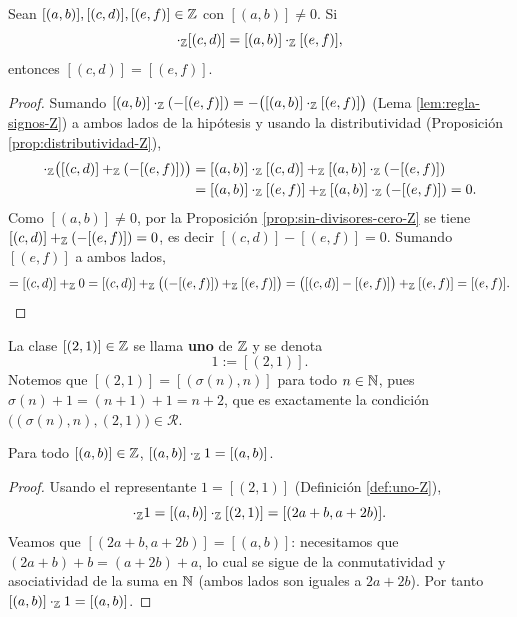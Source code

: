 \documentclass[12pt,a4paper]{book}
\begin{document}
    \begin{proposicion}
        \label{prop:cancelacion-Z}
        Sean $[(a,b)],[(c,d)],[(e,f)]\in\mathbb{Z}$ con $[(a,b)]\neq0$. Si
        \begin{equation*}
            [(a,b)]\cdot_{\Z}[(c,d)] = [(a,b)]\cdot_{\Z}[(e,f)],
        \end{equation*}
        entonces $[(c,d)]=[(e,f)]$.
    \end{proposicion}
    \begin{proof}
        Sumando $[(a,b)]\cdot_{\mathbb{Z}}(-[(e,f)])=-\big([(a,b)]\cdot_{\mathbb{Z}}[(e,f)]\big)$ (Lema \ref{lem:regla-signos-Z}) a ambos lados de la hipótesis y usando la distributividad (Proposición \ref{prop:distributividad-Z}),
        \begin{align*}
            [(a,b)]\cdot_{\Z}\big([(c,d)]+_{\Z}(-[(e,f)])\big) &= [(a,b)]\cdot_{\Z}[(c,d)] +_{\Z} [(a,b)]\cdot_{\Z}(-[(e,f)]) \\
            &= [(a,b)]\cdot_{\Z}[(e,f)] +_{\Z} [(a,b)]\cdot_{\Z}(-[(e,f)]) = 0.
        \end{align*}
        Como $[(a,b)]\neq0$, por la Proposición \ref{prop:sin-divisores-cero-Z} se tiene $[(c,d)]+_{\mathbb{Z}}(-[(e,f)])=0$, es decir $[(c,d)]-[(e,f)]=0$. Sumando $[(e,f)]$ a ambos lados,
        \begin{equation*}
            [(c,d)] = [(c,d)]+_{\Z}0 = [(c,d)]+_{\Z}\big((-[(e,f)])+_{\Z}[(e,f)]\big) = \big([(c,d)]-[(e,f)]\big)+_{\Z}[(e,f)] = [(e,f)].
        \end{equation*}
    \end{proof}

    \begin{definicion}[Uno de $\Z$]
        \label{def:uno-Z}
        La clase $[(2,1)]\in\mathbb{Z}$ se llama \textbf{uno} de $\Z$ y se denota
        \begin{equation*}
            1 := [(2,1)].
        \end{equation*}
        Notemos que $[(2,1)]=[(\sigma(n),n)]$ para todo $n\in\mathbb{N}$, pues $\sigma(n)+1=(n+1)+1=n+2$, que es exactamente la condición $\big((\sigma(n),n),(2,1)\big)\in\mathcal{R}$.
    \end{definicion}

    \begin{proposicion}
        \label{prop:uno-neutro-Z}
        Para todo $[(a,b)]\in\mathbb{Z}$, $[(a,b)]\cdot_{\mathbb{Z}}1 = [(a,b)]$.
    \end{proposicion}
    \begin{proof}
        Usando el representante $1=[(2,1)]$ (Definición \ref{def:uno-Z}),
        \begin{equation*}
            [(a,b)]\cdot_{\Z}1 = [(a,b)]\cdot_{\Z}[(2,1)] = [(2a+b,a+2b)].
        \end{equation*}
        Veamos que $[(2a+b,a+2b)]=[(a,b)]$: necesitamos que $(2a+b)+b=(a+2b)+a$, lo cual se sigue de la conmutatividad y asociatividad de la suma en $\mathbb{N}$ (ambos lados son iguales a $2a+2b$). Por tanto $[(a,b)]\cdot_{\mathbb{Z}}1=[(a,b)]$.
    \end{proof}
\end{document}
